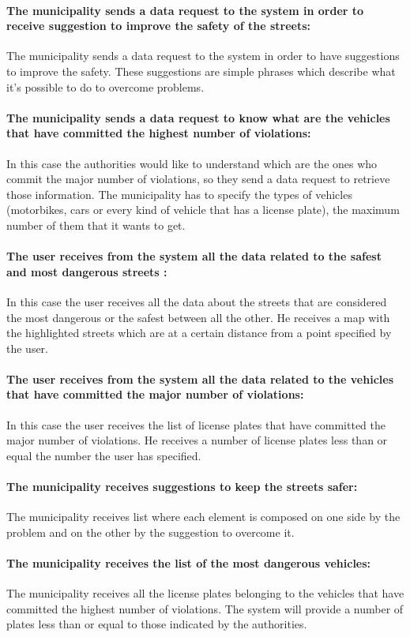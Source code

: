 \documentclass[titlepage]{article}
\begin{document}
\paragraph{The municipality sends a data request to the 				   system  in order to receive suggestion to improve 			   the 	safety 	of the streets: }
The municipality sends a data request to the system in order to have suggestions to improve the safety. These suggestions are simple phrases which describe what it's possible to do to overcome problems.
\paragraph{The municipality sends a data request to know what 		   are the vehicles that have committed the highest 	         		  number of violations: }
In this case the authorities would like to understand which are the ones who commit the major number of violations, so they send a data request to retrieve those information. The municipality has to specify the types of vehicles (motorbikes, cars or every kind of vehicle that has a license plate), the maximum number of them that it wants to get.
\paragraph{The user receives from the system all the data 			related to the safest and most dangerous streets : }
In this case the user receives all the data about the streets that are considered the most dangerous or the safest between all the other. He receives a map with the highlighted streets which are at a certain distance from a point specified by the user.
\paragraph{The user receives from the system all the data related to the vehicles that have committed the major number of violations:}
In this case the user receives the list of license plates that have committed the major number of violations. He receives a number of license plates less than or equal the number the user has specified.
\paragraph{The municipality receives suggestions to keep the streets safer: }
The municipality receives list where each element is composed on one side by the problem and on the other by the suggestion to overcome it.
\paragraph{The municipality receives the list of the most 			dangerous vehicles: }
The municipality receives all the license plates belonging to the vehicles that have committed the highest number of violations. The system will provide a number of plates less than or equal to those indicated by the authorities.
\end{document}
